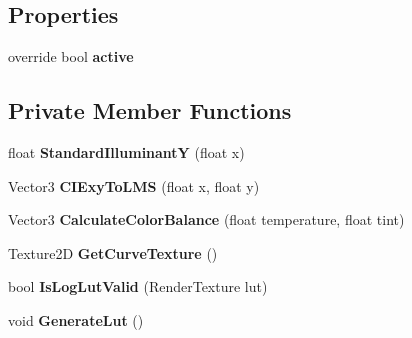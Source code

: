 \subsection*{Properties}
\begin{DoxyCompactItemize}
\item 
\mbox{\label{class_unity_engine_1_1_post_processing_1_1_color_grading_component_acc86c87eda1936a230afa7c7afad7be9}} 
override bool {\bfseries active}
\end{DoxyCompactItemize}
\subsection*{Private Member Functions}
\begin{DoxyCompactItemize}
\item 
\mbox{\label{class_unity_engine_1_1_post_processing_1_1_color_grading_component_a162bff0d2c5c8a3df92bfccec1847b58}} 
float {\bfseries Standard\+IlluminantY} (float x)
\item 
\mbox{\label{class_unity_engine_1_1_post_processing_1_1_color_grading_component_afbc5e9ca28f3f388c360838fec54b554}} 
Vector3 {\bfseries C\+I\+Exy\+To\+L\+MS} (float x, float y)
\item 
\mbox{\label{class_unity_engine_1_1_post_processing_1_1_color_grading_component_a772be961926234e3c23af30fb2e56642}} 
Vector3 {\bfseries Calculate\+Color\+Balance} (float temperature, float tint)
\item 
\mbox{\label{class_unity_engine_1_1_post_processing_1_1_color_grading_component_a1b45534c882ec1bb39aea31224adc880}} 
Texture2D {\bfseries Get\+Curve\+Texture} ()
\item 
\mbox{\label{class_unity_engine_1_1_post_processing_1_1_color_grading_component_a25d1905dd67f35815468477a03717786}} 
bool {\bfseries Is\+Log\+Lut\+Valid} (Render\+Texture lut)
\item 
\mbox{\label{class_unity_engine_1_1_post_processing_1_1_color_grading_component_a1b686d69a9a79fbff52554fbb8c1a70e}} 
void {\bfseries Generate\+Lut} ()
\end{DoxyCompactItemize}
